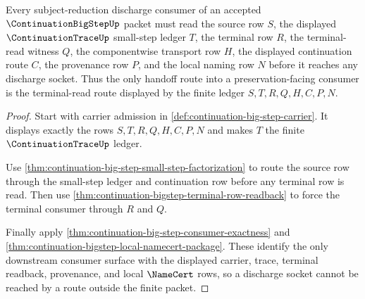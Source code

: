 \begin{theorem}
\label{thm:continuation-bigstep-subject-reduction-socket-handoff}
Every subject-reduction discharge consumer of an accepted
$\ContinuationBigStepUp$ packet must read the source row $S$, the displayed
$\ContinuationTraceUp$ small-step ledger $T$, the terminal row $R$, the
terminal-read witness $Q$, the componentwise transport row $H$, the displayed
continuation route $C$, the provenance row $P$, and the local naming row $N$
before it reaches any discharge socket. Thus the only handoff route into a
preservation-facing consumer is the terminal-read route displayed by the
finite ledger $S,T,R,Q,H,C,P,N$.
\end{theorem}
\begin{proof}
Start with carrier admission in
\autoref{def:continuation-big-step-carrier}. It displays exactly the rows
$S,T,R,Q,H,C,P,N$ and makes $T$ the finite $\ContinuationTraceUp$ ledger.

Use \autoref{thm:continuation-big-step-small-step-factorization} to route the
source row through the small-step ledger and continuation row before any
terminal row is read. Then use
\autoref{thm:continuation-bigstep-terminal-row-readback} to force the terminal
consumer through $R$ and $Q$.

Finally apply
\autoref{thm:continuation-big-step-consumer-exactness} and
\autoref{thm:continuation-bigstep-local-namecert-package}. These identify the
only downstream consumer surface with the displayed carrier, trace, terminal
readback, provenance, and local $\NameCert$ rows, so a discharge socket cannot
be reached by a route outside the finite packet.
\end{proof}

